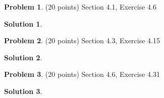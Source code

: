 \documentclass{article}
\theoremstyle{definition}
\newtheorem{problem}{Problem}
\newtheorem*{solution}{Solution}
\begin{document}
\newpage
\begin{problem} (20 points) Section 4.1, Exercise 4.6 
\end{problem}
\begin{solution} 
\end{solution}

\newpage
\begin{problem} (20 points) Section 4.3, Exercise 4.15
\end{problem}
\begin{solution} 
\end{solution}

\newpage
\begin{problem} (20 points) Section 4.6, Exercise 4.31
\end{problem}
\begin{solution} 
\end{solution}
\end{document}
